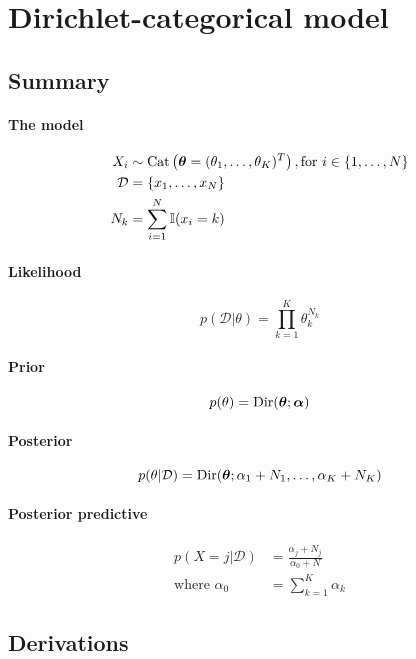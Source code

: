 \section{Dirichlet-categorical model}
\subsection{Summary}
\paragraph{The model}
    \begin{align}
        X_i         &\sim \operatorname{Cat}\left(\boldsymbol{\mathbf{\theta}} = (\theta_1, \dotsc, \theta_K)^T\right), \text{for } i \in \{1, \dotsc, N\} \\
        \mathcal D  &= \{x_1, \dotsc, x_N\} \\
        N_k         &= \sum_{i = 1}^N \mathbb I (x_i = k)
    \end{align}

\paragraph{Likelihood}
    \begin{equation}
        p(\mathcal D | \theta) = \prod_{k = 1}^K \theta_k^{N_k}
    \end{equation}

\paragraph{Prior}
    \begin{equation}
        p(\theta)   = \operatorname{Dir}(\boldsymbol{\mathbf{\theta}}; \boldsymbol{\mathbf{\alpha}})
    \end{equation}

\paragraph{Posterior}
    \begin{equation}
        p(\theta | \mathcal D) = \operatorname{Dir}(\boldsymbol{\mathbf{\theta}}; \alpha_1 + N_1, \dotsc, \alpha_K + N_K)
    \end{equation}

\paragraph{Posterior predictive}
    \begin{align}
        p(X = j | \mathcal D) &= \frac{\alpha_j + N_j}{\alpha_0 + N} \\
        \text{where } \alpha_0 &= \sum_{k = 1}^K \alpha_k
    \end{align}

\subsection{Derivations}
